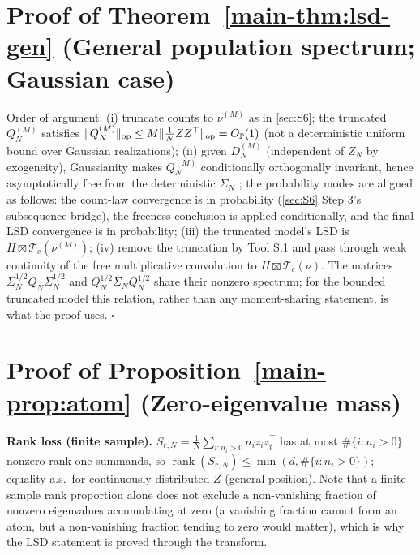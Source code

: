 \section{Proof of Theorem~\ref{main-thm:lsd-gen} (General population spectrum; Gaussian case)}\label{sec:S7}

Order of argument: (i) truncate counts to $\nu^{(M)}$ as in \ref{sec:S6}; the truncated $Q_N^{(M)}$ satisfies $\|Q_N^{(M)}\|_{\rm op}\le M\|\frac1NZZ^\top\|_{\rm op}=O_{\mathbb P}(1)$ (not a deterministic uniform bound over Gaussian realizations); (ii) given $D_N^{(M)}$ (independent of $Z_N$ by exogeneity), Gaussianity makes $Q_N^{(M)}$ conditionally orthogonally invariant, hence asymptotically free from the deterministic $\Sigma_N$ \cite{collins2006integration}; the probability modes are aligned as follows: the count-law convergence is in probability (\ref{sec:S6} Step 3's subsequence bridge), the freeness conclusion is applied conditionally, and the final LSD convergence is in probability; (iii) the truncated model's LSD is $H\boxtimes\mathcal T_c(\nu^{(M)})$; (iv) remove the truncation by Tool S.1 and pass through weak continuity of the free multiplicative convolution to $H\boxtimes\mathcal T_c(\nu)$. The matrices $\Sigma_N^{1/2}Q_N\Sigma_N^{1/2}$ and $Q_N^{1/2}\Sigma_NQ_N^{1/2}$ share their nonzero spectrum; for the bounded truncated model this relation, rather than any moment-sharing statement, is what the proof uses. $\square$

\section{Proof of Proposition~\ref{main-prop:atom} (Zero-eigenvalue mass)}\label{sec:S8}

\textbf{Rank loss (finite sample).} $S_{r,N}=\frac1N\sum_{i:n_i>0}n_iz_iz_i^\top$ has at most $\#\{i:n_i>0\}$ nonzero rank-one summands, so $\operatorname{rank}(S_{r,N})\le\min(d,\#\{i:n_i>0\})$; equality a.s.\ for continuously distributed $Z$ (general position). Note that a finite-sample rank proportion alone does not exclude a non-vanishing fraction of nonzero eigenvalues accumulating at zero (a vanishing fraction cannot form an atom, but a non-vanishing fraction tending to zero would matter), which is why the LSD statement is proved through the transform.

